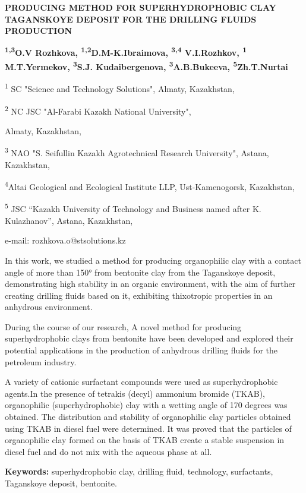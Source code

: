 \begin{center}
{\large\bfseries PRODUCING METHOD FOR SUPERHYDROPHOBIC CLAY TAGANSKOYE DEPOSIT
FOR THE DRILLING FLUIDS PRODUCTION}

{\bfseries \textsuperscript{1,3}O.V Rozhkova,
\textsuperscript{1,2}D.M-K.Ibraimova, \textsuperscript{3,4} V.I.Rozhkov,
\textsuperscript{1} M.T.Yermekov, \textsuperscript{3}S.J. Kudaibergenova,
\textsuperscript{3}A.B.Bukeeva, \textsuperscript{5}Zh.T.Nurtai}

\textsuperscript{1} SC "Science and Technology Solutions", Almaty,
Kazakhstan,

\textsuperscript{2} NC JSC "Al-Farabi Kazakh National University",

Almaty, Kazakhstan,

\textsuperscript{3} NAO "S. Seifullin Kazakh Agrotechnical Research
University", Astana, Kazakhstan,

\textsuperscript{4}Altai Geological and Ecological Institute LLP,
Ust-Kamenogorsk, Kazakhstan,

\textsuperscript{5} JSC ``Kazakh University of Technology and Business
named after K. Kulazhanov'', Astana, Kazakhstan,

e-mail: rozhkova.o@stsolutions.kz
\end{center}

In this work, we studied a method for producing organophilic clay with a
contact angle of more than 150° from bentonite clay from the Taganskoye
deposit, demonstrating high stability in an organic environment, with
the aim of further creating drilling fluids based on it, exhibiting
thixotropic properties in an anhydrous environment.

During the course of our research, A novel method for producing
superhydrophobic clays from bentonite have been developed and explored
their potential applications in the production of anhydrous drilling
fluids for the petroleum industry.

A variety of cationic surfactant compounds were used as superhydrophobic
agents.In the presence of tetrakis (decyl) ammonium bromide (TKAB),
organophilic (superhydrophobic) clay with a wetting angle of 170 degrees
was obtained. The distribution and stability of organophilic clay
particles obtained using TKAB in diesel fuel were determined. It was
proved that the particles of organophilic clay formed on the basis of
TKAB create a stable suspension in diesel fuel and do not mix with the
aqueous phase at all.

{\bfseries Keywords:} superhydrophobic clay, drilling fluid, technology,
surfactants, Taganskoye deposit, bentonite.


